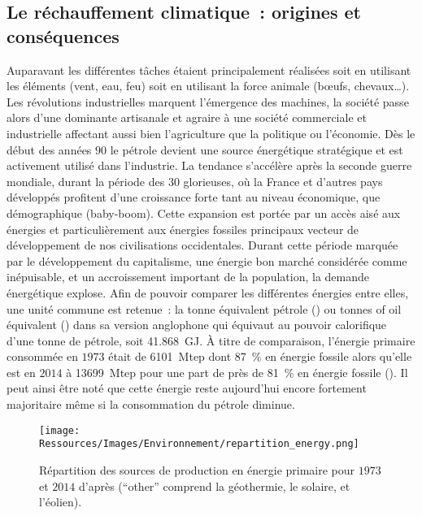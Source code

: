 \subsection{Le réchauffement climatique~: origines et conséquences} %
\label{sub:le_rechauffement_climatique_origines_et_consequences}
Auparavant les différentes tâches étaient principalement réalisées soit en utilisant les
éléments (vent, eau, feu) soit en utilisant la force animale (bœufs, chevaux\dots). Les
révolutions industrielles marquent l’émergence des machines, la société passe alors d’une
dominante artisanale et agraire à une société commerciale et industrielle affectant aussi
bien l’agriculture que la politique ou l’économie. Dès le début des années $90$ le
pétrole devient une source énergétique stratégique et est
activement utilisé dans l’industrie. La tendance s’accélère après la seconde guerre
mondiale, durant la période des $30$ glorieuses, où la France et d’autres pays développés
profitent d’une croissance forte tant au niveau économique, que démographique (baby-boom).
Cette expansion est portée par un accès aisé aux énergies et particulièrement aux énergies
fossiles principaux vecteur de développement de nos civilisations occidentales. Durant
cette période marquée par le développement du capitalisme, une énergie bon marché
considérée comme inépuisable, et un accroissement important de la population, la demande
énergétique explose. Afin de pouvoir comparer les différentes énergies entre elles, une
unité commune est retenue~: la tonne équivalent pétrole () ou tonnes of oil
équivalent () dans sa version anglophone qui équivaut au pouvoir calorifique
d’une tonne de pétrole, soit \SI{41.868}{\giga\joule}.
À titre de comparaison, l’énergie primaire consommée en $1973$ était de
\SI{6101}{\mega tep} dont \SI{87}{\percent} en énergie fossile alors qu’elle est en $2014$
à \SI{13699}{\mega tep} pour une part de près de \SI{81}{\percent} en énergie fossile
(). Il peut ainsi être noté que cette énergie
reste aujourd’hui encore fortement majoritaire même si la consommation du pétrole diminue.

\begin{figure}
    \centering
    \texttt{[image: Ressources/Images/Environnement/repartition\_energy.png]}
    \caption[Répartition des sources de production en énergie primaire pour $1973$ et $2014$]
            {Répartition des sources de production en énergie primaire pour
             $1973$ et $2014$ d’après \textcite{IEA2016} (\enquote{other} comprend
             la géothermie, le solaire, et l’éolien).}
    \label{fig:energy_fraction}
\end{figure}


